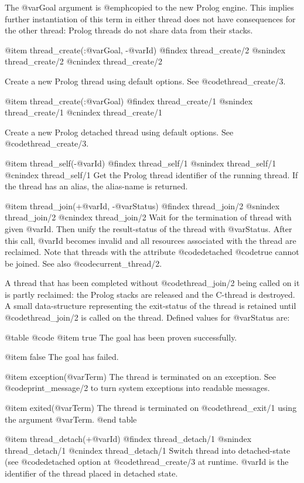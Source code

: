 The @var{Goal} argument is @emph{copied} to the new Prolog engine.
This implies further instantiation of this term in either thread does
not have consequences for the other thread: Prolog threads do not share
data from their stacks.

@item thread_create(:@var{Goal}, -@var{Id})
@findex thread_create/2
@snindex thread_create/2
@cnindex thread_create/2

Create a new Prolog thread using default options. See @code{thread_create/3}.

@item thread_create(:@var{Goal})
@findex thread_create/1
@snindex thread_create/1
@cnindex thread_create/1

Create a new Prolog detached thread using default options. See @code{thread_create/3}.

@item thread_self(-@var{Id})
@findex thread_self/1
@snindex thread_self/1
@cnindex thread_self/1
Get the Prolog thread identifier of the running thread.  If the thread
has an alias, the alias-name is returned.

@item thread_join(+@var{Id}, -@var{Status})
@findex thread_join/2
@snindex thread_join/2
@cnindex thread_join/2
Wait for the termination of thread with given @var{Id}.  Then unify the
result-status of the thread with @var{Status}.  After this call,
@var{Id} becomes invalid and all resources associated with the thread
are reclaimed.  Note that threads with the attribute @code{detached}
@code{true} cannot be joined.  See also @code{current_thread/2}.

A thread that has been completed without @code{thread_join/2} being
called on it is partly reclaimed: the Prolog stacks are released and the
C-thread is destroyed. A small data-structure representing the
exit-status of the thread is retained until @code{thread_join/2} is called on
the thread.  Defined values for @var{Status} are:

@table @code
    @item true
The goal has been proven successfully.

    @item false
The goal has failed.

    @item exception(@var{Term})
 The thread is terminated on an
exception.  See @code{print_message/2} to turn system exceptions into
readable messages.

    @item exited(@var{Term})
The thread is terminated on @code{thread_exit/1} using the argument @var{Term}.
@end table


@item thread_detach(+@var{Id})
@findex thread_detach/1
@snindex thread_detach/1
@cnindex thread_detach/1
Switch thread into detached-state (see @code{detached} option at
@code{thread_create/3} at runtime.  @var{Id} is the identifier of the thread
placed in detached state.


